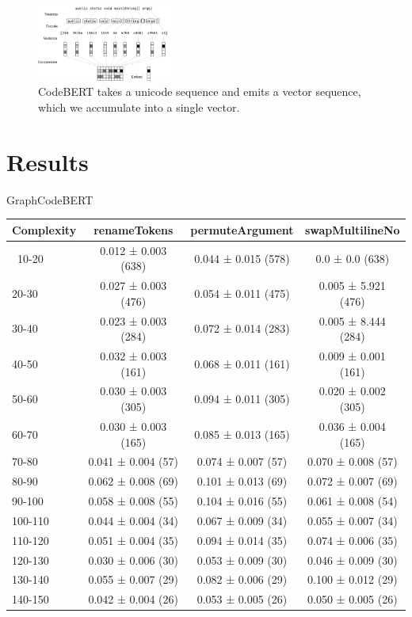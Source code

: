 \documentclass[sigconf,review,anonymous]{acmart}
\begin{document}
  \begin{figure}[H]
    \centering
    \includegraphics[width=0.40\textwidth]{figs/bert_embedding}
    \caption{CodeBERT takes a unicode sequence and emits a vector sequence, which we accumulate into a single vector.}
    \label{fig:bert}
  \end{figure}

  \section{Results}\label{sec:results}

  GraphCodeBERT
    {
    \begin{table}[H]
      \small
      \begin{tabular}{l|ccc}
        Complexity          & renameTokens        & permuteArgument     & swapMultilineNo     \\\hline\
        10-20               & 0.012 ± 0.003 (638) & 0.044 ± 0.015 (578) & 0.0 ± 0.0 (638)     \\
        20-30               & 0.027 ± 0.003 (476) & 0.054 ± 0.011 (475) & 0.005 ± 5.921 (476) \\
        30-40               & 0.023 ± 0.003 (284) & 0.072 ± 0.014 (283) & 0.005 ± 8.444 (284) \\
        40-50               & 0.032 ± 0.003 (161) & 0.068 ± 0.011 (161) & 0.009 ± 0.001 (161) \\
        50-60               & 0.030 ± 0.003 (305) & 0.094 ± 0.011 (305) & 0.020 ± 0.002 (305) \\
        60-70               & 0.030 ± 0.003 (165) & 0.085 ± 0.013 (165) & 0.036 ± 0.004 (165) \\
        70-80               & 0.041 ± 0.004 (57)  & 0.074 ± 0.007 (57)  & 0.070 ± 0.008 (57)  \\
        80-90               & 0.062 ± 0.008 (69)  & 0.101 ± 0.013 (69)  & 0.072 ± 0.007 (69)  \\
        90-100              & 0.058 ± 0.008 (55)  & 0.104 ± 0.016 (55)  & 0.061 ± 0.008 (54)  \\
        100-110             & 0.044 ± 0.004 (34)  & 0.067 ± 0.009 (34)  & 0.055 ± 0.007 (34)  \\
        110-120             & 0.051 ± 0.004 (35)  & 0.094 ± 0.014 (35)  & 0.074 ± 0.006 (35)  \\
        120-130             & 0.030 ± 0.006 (30)  & 0.053 ± 0.009 (30)  & 0.046 ± 0.009 (30)  \\
        130-140             & 0.055 ± 0.007 (29)  & 0.082 ± 0.006 (29)  & 0.100 ± 0.012 (29)  \\
        140-150             & 0.042 ± 0.004 (26)  & 0.053 ± 0.005 (26)  & 0.050 ± 0.005 (26)  \\
      \end{tabular}
    \end{table}
  }
\end{document}
